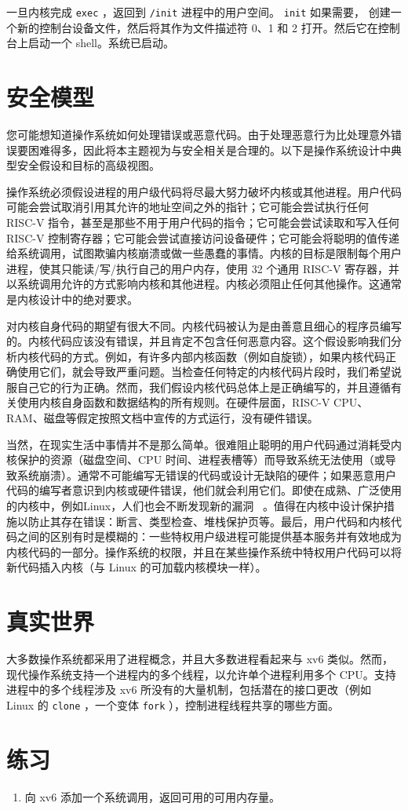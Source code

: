 \documentclass[UTF8]{article}
\begin{document}
一旦内核完成
    \lstinline{exec}    ，返回到   \lstinline{/init}   进程中的用户空间。
    \lstinline{init}   
 如果需要，       创建一个新的控制台设备文件，然后将其作为文件描述符 0、1 和 2 打开。然后它在控制台上启动一个 shell。系统已启动。  

   \section{安全模型  }     

您可能想知道操作系统如何处理错误或恶意代码。由于处理恶意行为比处理意外错误要困难得多，因此将本主题视为与安全相关是合理的。以下是操作系统设计中典型安全假设和目标的高级视图。  

操作系统必须假设进程的用户级代码将尽最大努力破坏内核或其他进程。用户代码可能会尝试取消引用其允许的地址空间之外的指针；它可能会尝试执行任何 RISC-V 指令，甚至是那些不用于用户代码的指令；它可能会尝试读取和写入任何 RISC-V 控制寄存器；它可能会尝试直接访问设备硬件；它可能会将聪明的值传递给系统调用，试图欺骗内核崩溃或做一些愚蠢的事情。内核的目标是限制每个用户进程，使其只能读/写/执行自己的用户内存，使用 32 个通用 RISC-V 寄存器，并以系统调用允许的方式影响内核和其他进程。内核必须阻止任何其他操作。这通常是内核设计中的绝对要求。  

对内核自身代码的期望有很大不同。内核代码被认为是由善意且细心的程序员编写的。内核代码应该没有错误，并且肯定不包含任何恶意内容。这个假设影响我们分析内核代码的方式。例如，有许多内部内核函数（例如自旋锁），如果内核代码正确使用它们，就会导致严重问题。当检查任何特定的内核代码片段时，我们希望说服自己它的行为正确。然而，我们假设内核代码总体上是正确编写的，并且遵循有关使用内核自身函数和数据结构的所有规则。在硬件层面，RISC-V CPU、RAM、磁盘等假定按照文档中宣传的方式运行，没有硬件错误。  

当然，在现实生活中事情并不是那么简单。很难阻止聪明的用户代码通过消耗受内核保护的资源（磁盘空间、CPU 时间、进程表槽等）而导致系统无法使用（或导致系统崩溃）。通常不可能编写无错误的代码或设计无缺陷的硬件；如果恶意用户代码的编写者意识到内核或硬件错误，他们就会利用它们。即使在成熟、广泛使用的内核中，例如Linux，人们也会不断发现新的漏洞~    \cite{mitre:cves}    。值得在内核中设计保护措施以防止其存在错误：断言、类型检查、堆栈保护页等。最后，用户代码和内核代码之间的区别有时是模糊的：一些特权用户级进程可能提供基本服务并有效地成为内核代码的一部分。操作系统的权限，并且在某些操作系统中特权用户代码可以将新代码插入内核（与 Linux 的可加载内核模块一样）。
    \section{真实世界  }     

大多数操作系统都采用了进程概念，并且大多数进程看起来与 xv6 类似。然而，现代操作系统支持一个进程内的多个线程，以允许单个进程利用多个 CPU。支持进程中的多个线程涉及 xv6 所没有的大量机制，包括潜在的接口更改（例如 Linux 的
    \lstinline{clone}    ，一个变体
    \lstinline{fork}    ），控制进程线程共享的哪些方面。
    \section{练习  }     

   \begin{enumerate}


   \item   向 xv6 添加一个系统调用，返回可用的可用内存量。  \end{enumerate}     
\end{document}
